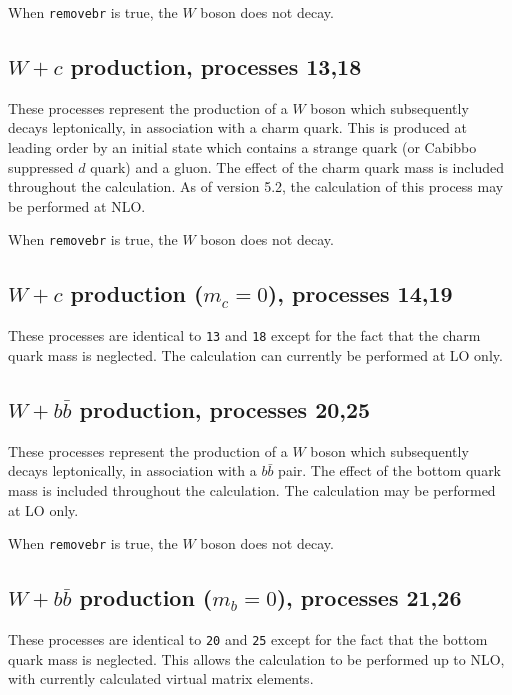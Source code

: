 \documentclass[12pt]{article}
\begin{document}
When {\tt removebr} is true, the $W$ boson does not decay.

\subsection{$W+c$ production, processes 13,18}
\label{subsec:wc}

These processes represent the production of a $W$ boson which
subsequently decays leptonically, in association with a charm
quark. This is produced at leading order by an initial state which
contains a strange quark (or Cabibbo suppressed $d$ quark) and a
gluon.  The effect of the charm quark mass is included throughout the
calculation.  As of version 5.2, the calculation of this process may
be performed at NLO.

When {\tt removebr} is true, the $W$ boson does not decay.

\subsection{$W+c$ production ($m_c=0$), processes 14,19}
\label{subsec:wcmassless}

These processes are identical to {\tt 13} and {\tt 18} except for the fact
that the charm quark mass is neglected. The calculation can currently be
performed at LO only.

\subsection{$W+b{\bar b}$ production, processes 20,25}
\label{subsec:wbb}

These processes represent the production of a $W$ boson which subsequently
decays leptonically, in association with a $b{\bar b}$ pair. The effect of
the bottom quark mass is included throughout the calculation.  
The calculation may be performed at LO only.

When {\tt removebr} is true, the $W$ boson does not decay.

\subsection{$W+b{\bar b}$ production ($m_b=0$), processes 21,26}
\label{subsec:wbbmassless}

These processes are identical to {\tt 20} and {\tt 25} except for the fact
that the bottom quark mass is neglected. This allows the calculation to be
performed up to NLO, with currently calculated virtual matrix elements.
\end{document}
